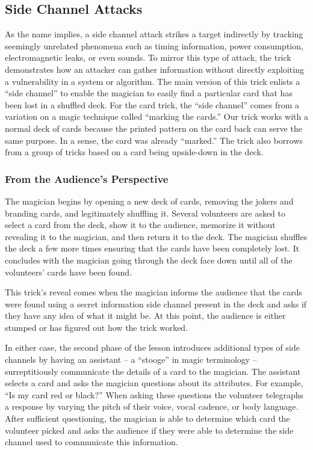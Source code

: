 \subsection{Side Channel Attacks}

As the name implies, a side channel attack strikes a target indirectly
by tracking seemingly unrelated phenomena
such as timing information, power consumption, electromagnetic leaks, or even
sounds.  To mirror this type of attack, the trick
demonstrates how an attacker can
gather information without directly exploiting
a vulnerability in a system or algorithm.
The main version of this trick enlists a ``side channel'' to
enable the magician to easily
find a particular card that has been lost in a shuffled deck.
For the card trick, the ``side channel'' comes from a variation on a magic
technique called ``marking the cards.''  Our trick works with a normal deck
of cards because  the printed pattern on the card back can serve the same purpose.  In a
sense, the card was already ``marked.''  The trick also borrows from a
group of tricks based on a card being upside-down in the deck.

\subsubsection{From the Audience's Perspective}

The magician begins by opening a new deck of cards, removing the jokers and
branding cards, and legitimately shuffling it.  Several volunteers are
asked to
select a card from the deck, show it to the audience, memorize it without
revealing it to the magician, and then return it to the deck.
The magician shuffles the deck a few more times ensuring that the cards
have
been completely lost.
It concludes with the magician going through the deck face down
until all of the volunteers' cards have been found.

This trick's reveal comes when the magician informs the audience
that the cards were found using a secret
information side channel present in the
deck and asks if they have any idea of what it might be.
At this point, the audience is either stumped or has figured out how the trick
worked.

In either case,  the second phase of the lesson
introduces additional types of side channels
by having an assistant
-- a ``stooge'' in magic terminology --
surreptitiously
communicate the details of a card
to the magician.
The assistant selects a card and asks the magician questions about its
attributes.
For example, ``Is my card red or black?''
When asking these questions the volunteer
telegraphs a response
by varying the pitch of their voice, vocal cadence, or body language.
After sufficient questioning, the magician is able to determine which card the
volunteer picked and asks the audience if they were able to determine the side
channel used to communicate this information.


